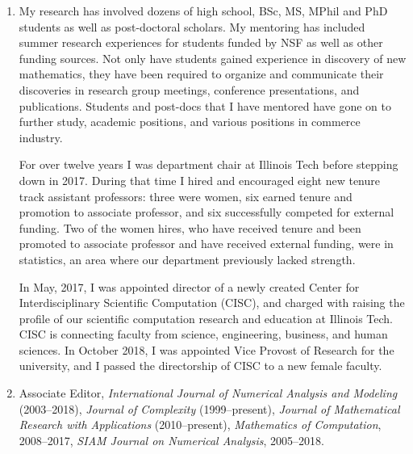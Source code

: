 \documentclass[11 pt]{NSFamsart}
\begin{document}
\medskip


\begin{enumerate} \renewcommand{\labelenumi}{[\arabic{enumi}]}
	   
		\item My research has involved dozens of high school, BSc, MS, MPhil and PhD students as 
		well as post-doctoral scholars.  My mentoring has included summer research experiences for 
		students funded by NSF as well as other funding sources.  Not only have 
		students gained experience in discovery of new mathematics, they have been required to 
		organize and communicate their discoveries in research group meetings, conference 
		presentations, and publications.  Students and post-docs that I have mentored have gone on to 
		further study, academic positions, and various positions in commerce industry.
		
		For over twelve years I was department chair at Illinois Tech before stepping down in 
		2017.  During that time I hired and encouraged eight new tenure track assistant professors: 
		three were women, six earned tenure and promotion to associate professor, and six 
		successfully 
		competed for external funding.  Two of the women hires, who have received tenure and been 
		promoted to associate professor and have received external funding, were in statistics, an area 
		where our department previously lacked strength.   
		
		In May, 2017, I was appointed director of a 
		newly 
		created Center for Interdisciplinary Scientific 
		Computation (CISC), and charged with raising the profile of our scientific computation research 
		and 
		education at Illinois Tech. CISC is connecting faculty from science, engineering, business, and 
		human sciences. 	In October 2018, I was appointed Vice Provost of Research for the university, and I passed the directorship of CISC to a new female faculty.

	    \item Associate Editor, {\em International Journal of Numerical Analysis and Modeling} 
	    (2003--2018), {\em Journal of Complexity} (1999--present), {\em Journal of Mathematical 
	    Research with Applications} (2010--present),
		{\em Mathematics of Computation}, 2008--2017, {\em SIAM Journal on Numerical Analysis}, 
		2005--2018.
		
	

\end{enumerate}
\end{document}
